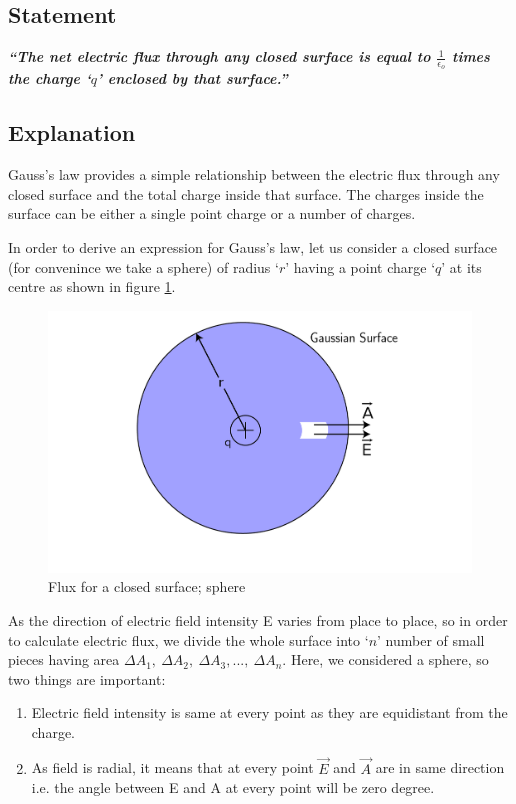 \subsection*{Statement}
\textbf{\textit{“The net electric flux through any closed surface is equal to $\frac{1}{\epsilon_{o}}$
times the charge `$q$' enclosed by that surface.”}}
\subsection*{Explanation}
Gauss’s law provides a simple relationship between the electric flux
through any closed surface and the total charge inside that surface.
The charges inside the surface can
be either a single point charge or a number of charges.

In order to derive an expression for Gauss’s law,
let us consider a closed surface (for convenince we take a sphere)
of radius `$r$' having a point charge `$q$'
at its centre as shown in figure \ref{fig:11.14}.
\begin{figure}[H]
  \centering
  \captionsetup{justification = centering}
  \includegraphics[scale = 0.7]{Images/Chapter-11/11.14.png}
  \caption{Flux for a closed surface; sphere}
  \label{fig:11.14}
\end{figure}
As the direction of electric field intensity E varies from place to place,
so in order to calculate electric flux, we divide the whole surface into `$n$’
number of small pieces having area $\Delta A_{1},\:\Delta A_{2},\:\Delta A_{3},...,\:\Delta A_{n}$.
Here, we considered a sphere, so two things are important:
\begin{enumerate}[label=(\roman*)]
  \item Electric field intensity is same at every point as they are equidistant from the charge.
  \item As field is radial, it means that at every point $\vec{E}$ and $\vec{A}$ are in same direction i.e. the angle between E and A at every point will be zero degree.
\end{enumerate}
